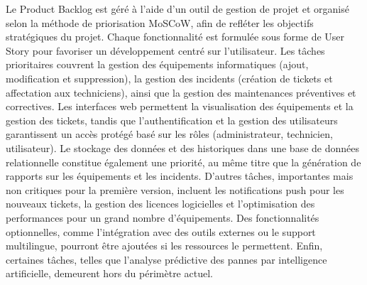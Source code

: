 Le Product Backlog est géré à l’aide d’un outil de gestion de projet et organisé selon la méthode de priorisation MoSCoW, afin de refléter les objectifs stratégiques du projet. Chaque fonctionnalité est formulée sous forme de User Story pour favoriser un développement centré sur l’utilisateur. Les tâches prioritaires couvrent la gestion des équipements informatiques (ajout, modification et suppression), la gestion des incidents (création de tickets et affectation aux techniciens), ainsi que la gestion des maintenances préventives et correctives. Les interfaces web permettent la visualisation des équipements et la gestion des tickets, tandis que l’authentification et la gestion des utilisateurs garantissent un accès protégé basé sur les rôles (administrateur, technicien, utilisateur). Le stockage des données et des historiques dans une base de données relationnelle constitue également une priorité, au même titre que la génération de rapports sur les équipements et les incidents. D’autres tâches, importantes mais non critiques pour la première version, incluent les notifications push pour les nouveaux tickets, la gestion des licences logicielles et l’optimisation des performances pour un grand nombre d’équipements. Des fonctionnalités optionnelles, comme l’intégration avec des outils externes ou le support multilingue, pourront être ajoutées si les ressources le permettent. Enfin, certaines tâches, telles que l’analyse prédictive des pannes par intelligence artificielle, demeurent hors du périmètre actuel.

